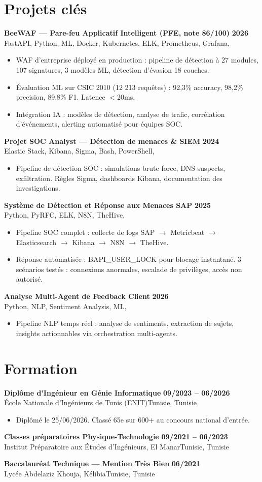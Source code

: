 \documentclass[a4paper,9pt]{article}
\newcommand{\cventry}[4]{\textbf{#1} \hfill \textbf{#4}\\[0.2pt]#2{\ifx\relax#3\relax\else, #3\fi}\par\vspace{0.3pt}}
\begin{document}
\section{Projets clés}
\cventry{BeeWAF --- Pare-feu Applicatif Intelligent (PFE, note 86/100)}{FastAPI, Python, ML, Docker, Kubernetes, ELK, Prometheus, Grafana}{}{2026}
\begin{itemize}
  \item WAF d'entreprise déployé en production : pipeline de détection à 27 modules, 107 signatures, 3 modèles ML, détection d'évasion 18 couches.
  \item Évaluation ML sur CSIC 2010 (12 213 requêtes) : 92,3\% accuracy, 98,2\% precision, 89,8\% F1. Latence $<$20ms.
  \item Intégration IA : modèles de détection, analyse de trafic, corrélation d'événements, alerting automatisé pour équipes SOC.
\end{itemize}
\cventry{Projet SOC Analyst --- Détection de menaces \& SIEM}{Elastic Stack, Kibana, Sigma, Bash, PowerShell}{}{2024}
\begin{itemize}
  \item Pipeline de détection SOC : simulations brute force, DNS suspects, exfiltration. Règles Sigma, dashboards Kibana, documentation des investigations.
\end{itemize}
\cventry{Système de Détection et Réponse aux Menaces SAP}{Python, PyRFC, ELK, N8N, TheHive}{}{2025}
\begin{itemize}
  \item Pipeline SOC complet : collecte de logs SAP $\rightarrow$ Metricbeat $\rightarrow$ Elasticsearch $\rightarrow$ Kibana $\rightarrow$ N8N $\rightarrow$ TheHive.
  \item Réponse automatisée : BAPI\_USER\_LOCK pour blocage instantané. 3 scénarios testés : connexions anormales, escalade de privilèges, accès non autorisé.
\end{itemize}
\cventry{Analyse Multi-Agent de Feedback Client}{Python, NLP, Sentiment Analysis, ML}{}{2026}
\begin{itemize}
  \item Pipeline NLP temps réel : analyse de sentiments, extraction de sujets, insights actionnables via orchestration multi-agents.
\end{itemize}
\section{Formation}
\cventry{Diplôme d'Ingénieur en Génie Informatique}{École Nationale d'Ingénieurs de Tunis (ENIT)}{Tunisie}{09/2023 -- 06/2026}
\begin{itemize}
  \item Diplômé le 25/06/2026. Classé 65e sur 600+ au concours national d'entrée.
\end{itemize}
\cventry{Classes préparatoires Physique-Technologie}{Institut Préparatoire aux Études d'Ingénieurs, El Manar}{Tunisie}{09/2021 -- 06/2023}
\cventry{Baccalauréat Technique --- Mention Très Bien}{Lycée Abdelaziz Khouja, Kélibia}{Tunisie}{06/2021}
\end{document}
